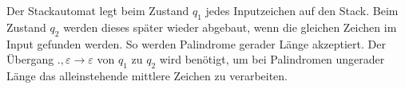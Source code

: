 \begin{loesung}
\begin{center}
\end{center}
Der Stackautomat legt beim Zustand $q_1$ jedes Inputzeichen auf
den Stack.
Beim Zustand $q_2$ werden dieses später wieder abgebaut, wenn die
gleichen Zeichen im Input gefunden werden.
So werden Palindrome gerader Länge akzeptiert.
Der Übergang $\texttt{.},\varepsilon\to\varepsilon$ von $q_1$
zu $q_2$ wird benötigt, um bei Palindromen ungerader Länge das
alleinstehende mittlere Zeichen zu verarbeiten.
\end{loesung}
